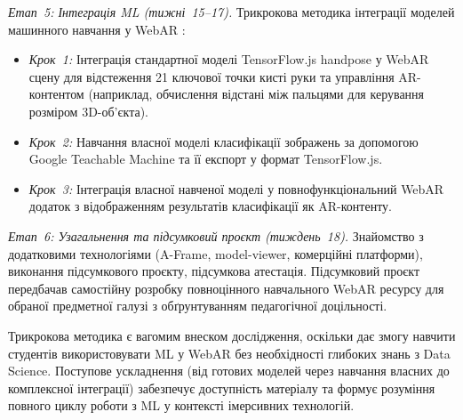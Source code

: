 \textit{Етап~5: Інтеграція ML (тижні~15--17).} Трикрокова методика інтеграції моделей машинного навчання у WebAR \cite{Semerikov2024WebARML_CoSinE, Semerikov2024WebAR_EduDim}:
\begin{itemize}
\item \textit{Крок~1:} Інтеграція стандартної моделі TensorFlow.js handpose у WebAR сцену для відстеження 21 ключової точки кисті руки та управління AR-контентом (наприклад, обчислення відстані між пальцями для керування розміром 3D-об'єкта).
\item \textit{Крок~2:} Навчання власної моделі класифікації зображень за допомогою Google Teachable Machine та її експорт у формат TensorFlow.js.
\item \textit{Крок~3:} Інтеграція власної навченої моделі у повнофункціональний WebAR додаток з відображенням результатів класифікації як AR-контенту.
\end{itemize}

\textit{Етап~6: Узагальнення та підсумковий проєкт (тиждень~18).} Знайомство з додатковими технологіями (A-Frame, model-viewer, комерційні платформи), виконання підсумкового проєкту, підсумкова атестація. Підсумковий проєкт передбачав самостійну розробку повноцінного навчального WebAR ресурсу для обраної предметної галузі з обґрунтуванням педагогічної доцільності.

Трикрокова методика є вагомим внеском дослідження, оскільки дає змогу навчити студентів використовувати ML у WebAR без необхідності глибоких знань з Data Science. Поступове ускладнення (від готових моделей через навчання власних до комплексної інтеграції) забезпечує доступність матеріалу та формує розуміння повного циклу роботи з ML у контексті імерсивних технологій.
